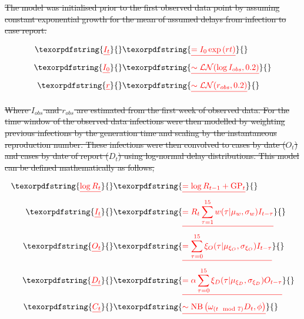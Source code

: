 \documentclass[10pt,letterpaper]{article}
\providecommand{\DIFdeltex}[1]{{\protect\color{red}\sout{#1}}}                      %
\providecommand{\DIFdel}[1]{\texorpdfstring{\DIFdeltex{#1}}{}} %
\begin{document}



\DIFdel{The model was initialised prior to the first observed data point by
assuming constant exponential growth for the mean of assumed delays from
infection to case report. }%

\begin{align*}
  \DIFdel{I_{t} }&\DIFdel{= I_0 \exp  \left(r t \right)  }\\
  \DIFdel{I_0 }&\DIFdel{\sim \mathcal{LN}(\log I_{obs}, 0.2) }\\
  \DIFdel{r }&\DIFdel{\sim \mathcal{LN}(r_{obs}, 0.2) 
}\end{align*}%

\DIFdel{Where \(I_{obs}\) and \(r_{obs}\) are estimated from the first week of observed data. For the
time window of the observed data infections were
then modelled by weighting previous infections by the generation time
and scaling by the instantaneous reproduction number.
These infections
were then convolved to cases by date (\(O_t\)) and cases by date of
report (\(D_t\)) using log-normal delay distributions. This model can be
defined mathematically as follows, }%

\begin{align*}
  \DIFdel{\log R_{t} }&\DIFdel{= \log R_{t-1} + \mathrm{GP}_t }\\
  \DIFdel{I_t }&\DIFdel{= R_t \sum_{\tau = 1}^{15} w(\tau | \mu_{w}, \sigma_{w}) I_{t - \tau} }\\
  \DIFdel{O_t }&\DIFdel{= \sum_{\tau = 0}^{15} \xi_{O}(\tau | \mu_{\xi_{O}}, \sigma_{\xi_{O}}) I_{t-\tau} }\\
  \DIFdel{D_t }&\DIFdel{= \alpha \sum_{\tau = 0}^{15} \xi_{D}(\tau | \mu_{\xi_{D}}, \sigma_{\xi_{D}}) O_{t-\tau} }\\ 
  \DIFdel{C_t }&\DIFdel{\sim \mathrm{NB}\left(\omega_{(t \mod 7)}D_t, \phi\right)
}\end{align*}%
\end{document}
